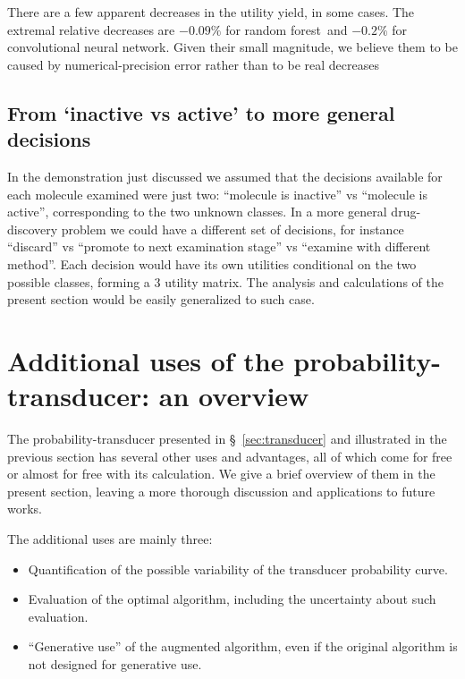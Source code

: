 \documentclass[\ifafour a4paper,12pt,\else a5paper,10pt,\fi%
onecolumn,oneside,article,%
british%
]{memoir}
\theoremstyle{remark}
\theoremstyle{innote}
\renewcommand*{\|}[1][]{\nonscript\:#1\vert\nonscript\:\mathopen{}}
\newcommand*{\sect}{\S}%
\newcommand*{\RF}{random forest}
\newcommand*{\CNN}{convolutional neural network}
\begin{document}
There are a few apparent decreases in the utility yield, in some cases. The extremal relative decreases are $-0.09\%$ for \RF\ and  $-0.2\%$ for \CNN. Given their small magnitude, we believe them to be caused by numerical-precision error rather than to be real decreases %

\subsection{From `inactive vs active' to more general decisions}
\label{sec:gen_decision}

In the demonstration just discussed we assumed that the decisions available for each molecule examined were just two: \enquote{molecule is inactive} vs \enquote{molecule is active}, corresponding to the two unknown classes. In a more general drug-discovery problem we could have a different set of decisions, for instance \enquote{discard} vs \enquote{promote to next examination stage} vs \enquote{examine with different method}. Each decision would have its own utilities conditional on the two possible classes, forming a 3 utility matrix. The analysis and calculations of the present section would be easily generalized to such case.


\section{Additional uses of the probability-transducer: an overview}
\label{sec:overview_other_uses}

The probability-transducer presented in \sect~\ref{sec:transducer} and illustrated in the previous section has several other uses and advantages, all of which come for free or almost for free with its calculation. We give a brief overview of them in the present section, leaving a more thorough discussion and applications to future works.

The additional uses are mainly three:
\begin{itemize}
\item Quantification of the possible variability of the transducer probability curve.
\item Evaluation of the optimal algorithm, including the uncertainty about such evaluation.
\item \enquote{Generative use} of the augmented algorithm, even if the original algorithm is not designed for generative use.
\end{itemize}
\end{document}
